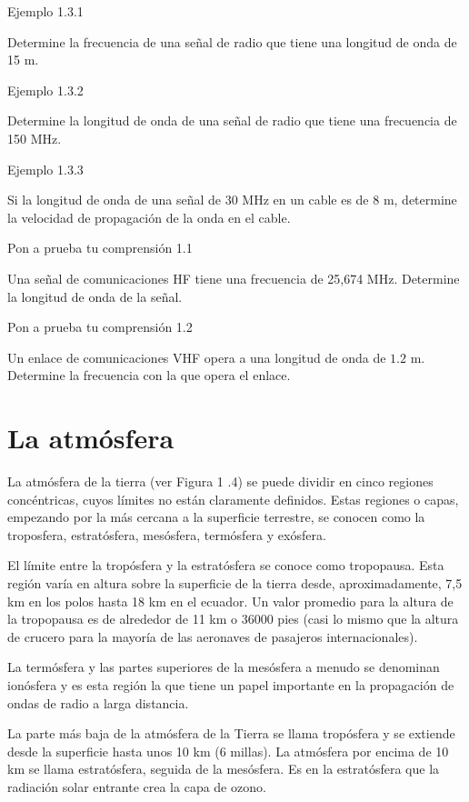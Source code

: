 Ejemplo 1.3.1

Determine la frecuencia de una señal de radio que tiene una longitud de onda de 15 m.



Ejemplo 1.3.2

Determine la longitud de onda de una señal de radio que tiene una frecuencia de 150 MHz.

Ejemplo 1.3.3

Si la longitud de onda de una señal de 30 MHz en un cable es de 8 m, determine la velocidad de propagación de la onda en el cable.

Pon a prueba tu comprensión 1.1

Una señal de comunicaciones HF tiene una frecuencia de 25,674 MHz. Determine la longitud de onda de la señal.

Pon a prueba tu comprensión 1.2

Un enlace de comunicaciones VHF opera a una longitud de onda de $1.2$ m. Determine la frecuencia con la que opera el enlace.

\section{La atmósfera}
\label{sec:A.06.la.atmosfera}

La atmósfera de la tierra (ver Figura 1 .4) se puede dividir en cinco regiones concéntricas, cuyos límites  no están claramente definidos. Estas regiones o capas, empezando por la  más cercana a la superficie terrestre, se conocen como la troposfera,
estrat\'osfera, mes\'osfera, term\'osfera y ex\'osfera.

El límite entre la trop\'osfera y la estrat\'osfera se conoce como tropopausa. Esta región varía en altura sobre la superficie de la tierra desde, aproximadamente, 7,5 km en los polos hasta 18 km en el ecuador. Un valor promedio para la altura de la tropopausa es de alrededor de 11 km o 36000 pies (casi lo mismo que la altura de crucero para la mayoría de las aeronaves de pasajeros internacionales).

La term\'osfera y las partes superiores de la mes\'osfera a menudo se denominan ion\'osfera y es esta región la que tiene un papel importante en la propagación de ondas de radio a larga distancia.

La parte más baja de la atmósfera de la Tierra se llama trop\'osfera y se extiende desde la superficie hasta unos 10 km (6 millas). La atmósfera por encima de 10 km se llama estrat\'osfera, seguida de la mes\'osfera. Es en la estrat\'osfera que la radiación solar entrante crea la capa de ozono.

